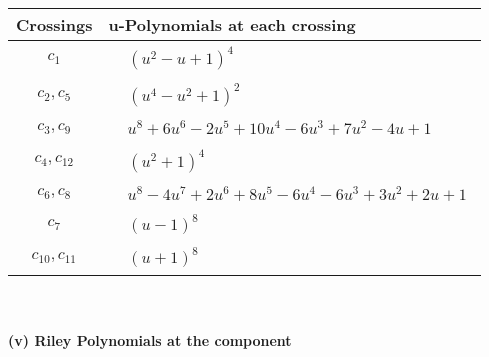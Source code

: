 \documentclass[1p]{elsarticle_modified}
\theoremstyle{definition}
\begin{document}
\begin{tabular}{m{50pt}|m{274pt}}
Crossings & \hspace{64pt}u-Polynomials at each crossing \\
\hline $$\begin{aligned}c_{1}\end{aligned}$$&$\begin{aligned}
&(u^2- u+1)^4
\end{aligned}$\\
\hline $$\begin{aligned}c_{2},c_{5}\end{aligned}$$&$\begin{aligned}
&(u^4- u^2+1)^2
\end{aligned}$\\
\hline $$\begin{aligned}c_{3},c_{9}\end{aligned}$$&$\begin{aligned}
&u^8+6 u^6-2 u^5+10 u^4-6 u^3+7 u^2-4 u+1
\end{aligned}$\\
\hline $$\begin{aligned}c_{4},c_{12}\end{aligned}$$&$\begin{aligned}
&(u^2+1)^4
\end{aligned}$\\
\hline $$\begin{aligned}c_{6},c_{8}\end{aligned}$$&$\begin{aligned}
&u^8-4 u^7+2 u^6+8 u^5-6 u^4-6 u^3+3 u^2+2 u+1
\end{aligned}$\\
\hline $$\begin{aligned}c_{7}\end{aligned}$$&$\begin{aligned}
&(u-1)^8
\end{aligned}$\\
\hline $$\begin{aligned}c_{10},c_{11}\end{aligned}$$&$\begin{aligned}
&(u+1)^8
\end{aligned}$\\
\hline
\end{tabular}\\~\\
\newpage\renewcommand{\arraystretch}{1}
\flushleft \textbf{(v) Riley Polynomials at the component}\newline \\
\end{document}
